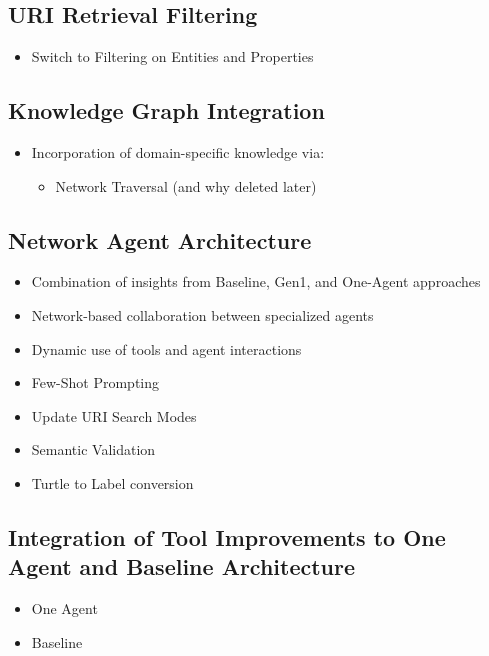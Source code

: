\documentclass[a4paper,oneside,bibliography=totoc]{scrbook}
\begin{document}
\subsection{URI Retrieval Filtering}
\label{subsec:uri_retrieval_filtering}
\begin{itemize}
  \item Switch to Filtering on Entities and Properties
\end{itemize}

\subsection{Knowledge Graph Integration}
\label{subsec:knowledge_graph_integration}
\begin{itemize}
  \item Incorporation of domain-specific knowledge via:
        \begin{itemize}
          \item Network Traversal (and why deleted later)

        \end{itemize}
\end{itemize}

\subsection{Network Agent Architecture}
\label{subsec:full_network_agent_architecture}
\begin{itemize}
  \item Combination of insights from Baseline, Gen1, and One-Agent approaches
  \item Network-based collaboration between specialized agents
  \item Dynamic use of tools and agent interactions
  \item Few-Shot Prompting
  \item Update URI Search Modes
  \item Semantic Validation
  \item Turtle to Label conversion
\end{itemize}

\subsection{Integration of Tool Improvements to One Agent and Baseline Architecture}
\label{subsec:performance_increases_gen2}
\begin{itemize}
  \item One Agent
  \item Baseline
\end{itemize}
\end{document}
